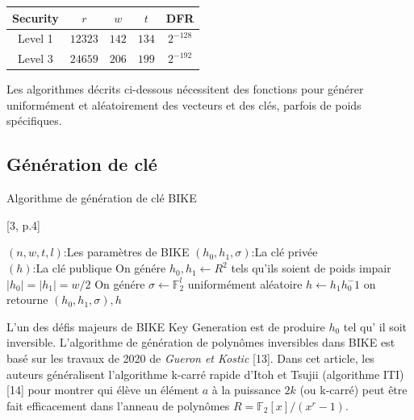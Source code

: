 \documentclass[12pt,openany]{report}
\begin{document}
\begin{center}
\begin{tabular}{ |c|c c c|c|}
\hline
Security  &$r$ & $w$ & $t$& DFR\\
\hline
Level 1 &$12323$ &$142$&$134$&$2^{-128}$\\
Level 3 &$24659$ &$206$ &$199$&$2^{-192}$\\
\hline
\end{tabular}
\end{center}

Les algorithmes décrits ci-dessous nécessitent des fonctions pour générer uniformément et aléatoirement des vecteurs et des clés, parfois de poids spécifiques.

\subsection{Génération de clé}
\begin{center}


\begin{algorithm}
\caption{Algorithme de génération de clé BIKE}[3, p.4]
\label{alg:cap2}
\begin{algorithmic}[1]
\Require $(n,w,t,l)$:Les paramètres de BIKE
\Ensure $(h_0,h_1,\sigma)$:La clé privée\\
        $(h)$:La clé publique
\State On génére $h_0,h_1 \longleftarrow \mathit{R}^2$ tels qu'ils soient de poids impair  $\mid h_0 \mid =\mid h_1 \mid=w/2$
\State On génére $ \sigma  \longleftarrow \mathbb{F}^l_2$ uniformément aléatoire
\State $ h\gets h_1h_0^-1$
\State on retourne $(h_0,h_1,\sigma),h$
\end{algorithmic}
\end{algorithm}
\end{center}

\begin{tipblock}

L'un des défis majeurs de BIKE Key Generation est de produire $h_0$ tel qu'
il soit inversible. L'algorithme de génération de polynômes inversibles dans BIKE est
basé sur les travaux de 2020 de \textit{ Gueron et Kostic} [13]. Dans cet article, les auteurs généralisent l'algorithme k-carré rapide d'Itoh et Tsujii (algorithme ITI) [14] pour montrer
qui élève un élément $a$ à la puissance $2k$
(ou k-carré) peut être fait efficacement
dans l'anneau de polynômes   $\mathit{R}=\mathbb{F}_2[x]/(x^r - 1)$.

\end{tipblock}
\end{document}
